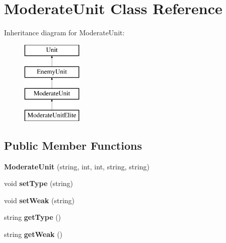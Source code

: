 \hypertarget{class_moderate_unit}{}\section{Moderate\+Unit Class Reference}
\label{class_moderate_unit}
Inheritance diagram for Moderate\+Unit\+:\begin{figure}[H]
\begin{center}
\leavevmode
\includegraphics[height=4.000000cm]{class_moderate_unit}
\end{center}
\end{figure}
\subsection*{Public Member Functions}
\begin{DoxyCompactItemize}
\item 
\hypertarget{class_moderate_unit_af450a9f4bb904b9c5c3e22b05fd436f9}{}{\bfseries Moderate\+Unit} (string, int, int, string, string)\label{class_moderate_unit_af450a9f4bb904b9c5c3e22b05fd436f9}

\item 
\hypertarget{class_moderate_unit_a11a78a8ca570fdd48fafcbf98ec73a74}{}void {\bfseries set\+Type} (string)\label{class_moderate_unit_a11a78a8ca570fdd48fafcbf98ec73a74}

\item 
\hypertarget{class_moderate_unit_affd75b90bdf05302caf081f6abfc9f18}{}void {\bfseries set\+Weak} (string)\label{class_moderate_unit_affd75b90bdf05302caf081f6abfc9f18}

\item 
\hypertarget{class_moderate_unit_a20d91613d3f14a9c33a02adf6e844338}{}string {\bfseries get\+Type} ()\label{class_moderate_unit_a20d91613d3f14a9c33a02adf6e844338}

\item 
\hypertarget{class_moderate_unit_a0bb728728033b2809bd9ce7dbf4f2c48}{}string {\bfseries get\+Weak} ()\label{class_moderate_unit_a0bb728728033b2809bd9ce7dbf4f2c48}

\end{DoxyCompactItemize}
